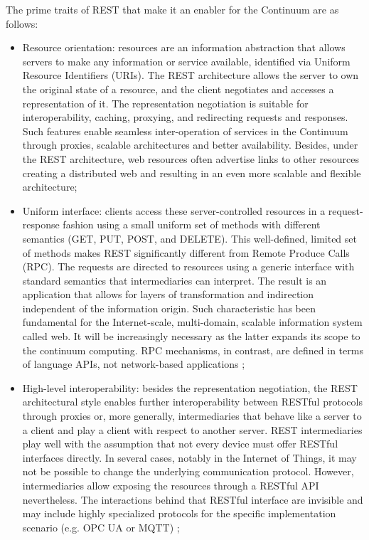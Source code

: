 The prime traits of REST that make it an enabler for the Continuum are as follows:

\begin{itemize}
    \item Resource orientation: resources are an information abstraction that allows servers to make any information or service available, identified via Uniform Resource Identifiers (URIs). The REST architecture allows the server to own the original state of a resource, and the client negotiates and accesses a representation of it. The representation negotiation is suitable for interoperability, caching, proxying, and redirecting requests and responses. Such features enable seamless inter-operation of services in the Continuum through proxies, scalable architectures and better availability. Besides, under the REST architecture, web resources often advertise links to other resources creating a distributed web and resulting in an even more scalable and flexible architecture;
    \item Uniform interface: clients access these server-controlled resources in a request-response fashion using a small uniform set of methods with different semantics (GET, PUT, POST, and DELETE). This well-defined, limited set of methods makes REST significantly different from Remote Produce Calls (RPC). The requests are directed to resources using a generic interface with standard semantics that intermediaries can interpret. The result is an application that allows for layers of transformation and indirection independent of the information origin. Such characteristic has been fundamental for the Internet-scale, multi-domain, scalable information system called web. It will be increasingly necessary as the latter expands its scope to the continuum computing. RPC mechanisms, in contrast, are defined in terms of language APIs, not network-based applications \cite{rest};
    \item High-level interoperability: besides the representation negotiation, the REST architectural style enables further interoperability between RESTful protocols through proxies or, more generally, intermediaries that behave like a server to a client and play a client with respect to another server. REST intermediaries play well with the assumption that not every device must offer RESTful interfaces directly. In several cases, notably in the Internet of Things, it may not be possible to change the underlying communication protocol. However, intermediaries allow exposing the resources through a RESTful API nevertheless. The interactions behind that RESTful interface are invisible and may include highly specialized protocols for the specific implementation scenario (e.g. OPC UA or MQTT) \cite{guinard2010resource};

\end{itemize}
